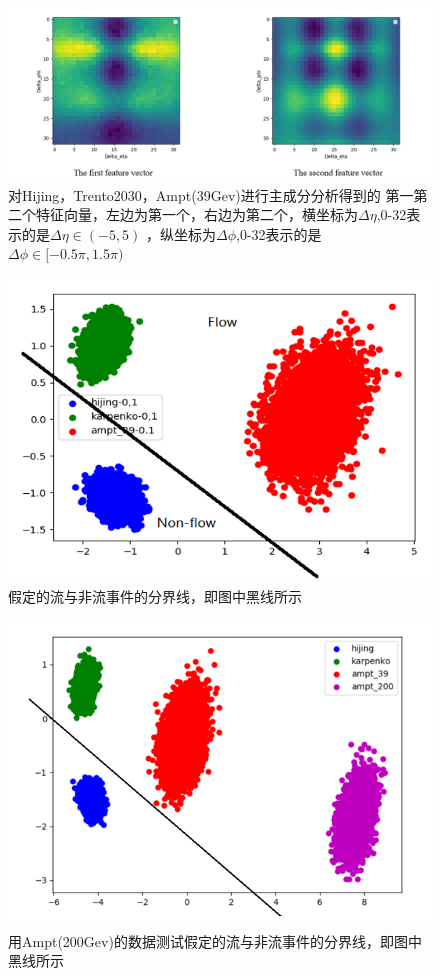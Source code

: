 \documentclass[aps,pre,12pt,preprint,onecolumn,showpacs,showkeys]{revtex4-1}
\begin{document}
\begin{figure}[htbp]
\centering
\includegraphics[width=140mm]{tzxl}
\caption{\label{fig:tzxl}%
对Hijing，Trento2030，Ampt(39Gev)进行主成分分析得到的
第一第二个特征向量，左边为第一个，右边为第二个，横坐标为$\Delta\eta$,0-32表示的是$\Delta\eta\in(-5,5)$
，纵坐标为$\Delta\phi$,0-32表示的是$\Delta\phi\in[-0.5\pi,1.5\pi)$}
\end{figure}
\begin{figure}[htbp]
\centering
\includegraphics[width=140mm]{qb}
\caption{\label{fig:qb}%
假定的流与非流事件的分界线，即图中黑线所示}
\end{figure}
\begin{figure}[htbp]
\centering
\includegraphics[width=140mm]{cs}
\caption{\label{fig:cs}%
用Ampt(200Gev)的数据测试假定的流与非流事件的分界线，即图中黑线所示}
\end{figure}
\end{document}
